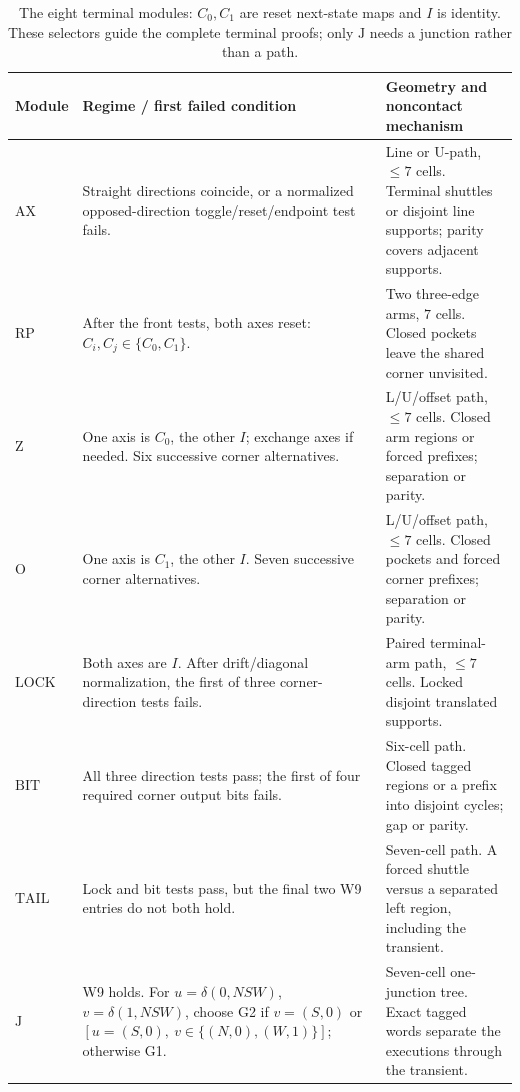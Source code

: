\begin{table}[!htbp]
\centering\small
\setlength{\tabcolsep}{4pt}
\renewcommand{\arraystretch}{1.08}
\begin{tabularx}{\linewidth}{@{}lP{.44\linewidth}Y@{}}
\toprule
Module & Regime / first failed condition & Geometry and noncontact mechanism \\
\midrule
$\mathrm{AX}$ & Straight directions coincide, or a normalized opposed-direction toggle/reset/endpoint test fails.
& Line or U-path, $\le7$ cells. Terminal shuttles or disjoint line supports; parity covers adjacent supports. \\
\addlinespace[3pt]
$\mathrm{RP}$ & After the front tests, both axes reset: $C_i,C_j\in\{C_0,C_1\}$.
& Two three-edge arms, $7$ cells. Closed pockets leave the shared corner unvisited. \\
\addlinespace[3pt]
$\mathrm Z$ & One axis is $C_0$, the other $I$; exchange axes if needed. Six successive corner alternatives.
& L/U/offset path, $\le7$ cells. Closed arm regions or forced prefixes; separation or parity. \\
\addlinespace[3pt]
$\mathrm O$ & One axis is $C_1$, the other $I$. Seven successive corner alternatives.
& L/U/offset path, $\le7$ cells. Closed pockets and forced corner prefixes; separation or parity. \\
\addlinespace[3pt]
$\mathrm{LOCK}$ & Both axes are $I$. After drift/diagonal normalization, the first of three corner-direction tests fails.
& Paired terminal-arm path, $\le7$ cells. Locked disjoint translated supports. \\
\addlinespace[3pt]
$\mathrm{BIT}$ & All three direction tests pass; the first of four required corner output bits fails.
& Six-cell path. Closed tagged regions or a prefix into disjoint cycles; gap or parity. \\
\addlinespace[3pt]
$\mathrm{TAIL}$ & Lock and bit tests pass, but the final two W9 entries do not both hold.
& Seven-cell path. A forced shuttle versus a separated left region, including the transient. \\
\addlinespace[3pt]
$\mathrm J$ & W9 holds. For $u=\delta(0,NSW)$, $v=\delta(1,NSW)$, choose G2 if $v=(S,0)$ or $[u=(S,0),\ v\in\{(N,0),(W,1)\}]$; otherwise G1.
& Seven-cell one-junction tree. Exact tagged words separate the executions through the transient. \\
\bottomrule
\end{tabularx}
\caption{The eight terminal modules: $C_0,C_1$ are reset next-state maps and $I$ is identity. These selectors guide the complete terminal proofs; only $\mathrm J$ needs a junction rather than a path.}
\label{tab:obstruction-modules}
\end{table}
